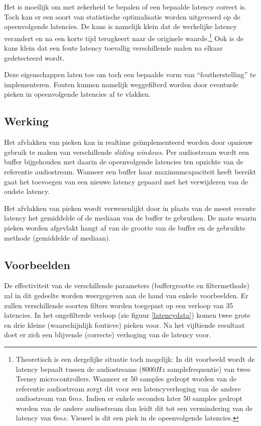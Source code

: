 Het is moeilijk om met zekerheid te bepalen of een bepaalde latency correct is. Toch kan er een soort van statistische optimalisatie worden uitgevoerd op de opeenvolgende latencies. De kans is namelijk klein dat de werkelijke latency verandert en na een korte tijd terugkeert naar de originele waarde.\footnote{Theoretisch is een dergelijke situatie toch mogelijk: In dit voorbeeld wordt de latency bepaalt tussen de audiostreams ($ 8000 Hz$ samplefrequentie) van twee Teensy microcontrollers. Wanneer er 50 samples gedropt worden van de referentie audiostream zorgt dit voor een latencyverhoging van de andere audiostream van $6 ms$. Indien er enkele seconden later 50 samples gedropt worden van de andere audiostream dan leidt dit tot een vermindering van de latency van $ 6 ms $. Visueel is dit een piek in de opeenvolgende latencies.} Ook is de kans klein dat een foute latency toevallig verschillende malen na elkaar gedetecteerd wordt.

Deze eigenschappen laten toe om toch een bepaalde vorm van ``foutherstelling'' te implementeren. Fouten kunnen namelijk weggefilterd worden door eventuele pieken in opeenvolgende latencies af te vlakken.

\subsection{Werking}

Het afvlakken van pieken kan in realtime geïmplementeerd worden door opnieuw gebruik te maken van verschillende \textit{sliding windows}. Per audiostream wordt een buffer bijgehouden met daarin de opeenvolgende latencies ten opzichte van de referentie audiostream. Wanneer een buffer haar maximumcapaciteit heeft bereikt gaat het toevoegen van een nieuwe latency gepaard met het verwijderen van de oudste latency.

Het afvlakken van pieken wordt verwezenlijkt door in plaats van de meest recente latency het gemiddelde of de mediaan van de buffer te gebruiken. De mate waarin pieken worden afgevlakt hangt af van de grootte van de buffer en de gebruikte methode (gemiddelde of mediaan).

\subsection{Voorbeelden}

De effectiviteit van de verschillende parameters (buffergrootte en filtermethode) zal in dit gedeelte worden weergegeven aan de hand van enkele voorbeelden. Er zullen verschillende soorten filters worden toegepast op een verloop van 35 latencies. In het ongefilterde verloop (zie figuur \ref{latencydata}) komen twee grote en drie kleine (waarschijnlijk foutieve) pieken voor. Na het vijftiende resultaat doet er zich een blijvende (correcte) verhoging van de latency voor.

